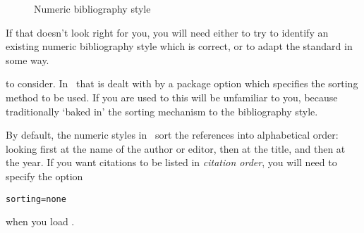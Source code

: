 \begin{figure}
\caption{Numeric bibliography style\label{numeric-examples}}
\end{figure}

If that doesn't look right for you, you will need either to try to
identify an existing numeric bibliography style which is correct, or
to adapt the standard in some way.

 to consider. In \biblatex\ that
is dealt with by a package option which specifies the sorting method
to be used. If you are used to  this will be
unfamiliar to you, because traditionally  `baked in'
the sorting mechanism to the bibliography style.

By default, the numeric styles in \biblatex\ sort the references into
alphabetical order: looking first at the name of the author or editor,
then at the title, and then at the year. If you want citations to be
listed in \emph{citation order}, you will need to specify the option
\begin{center}
\verb|sorting=none|
\end{center}
when you load \biblatex.

